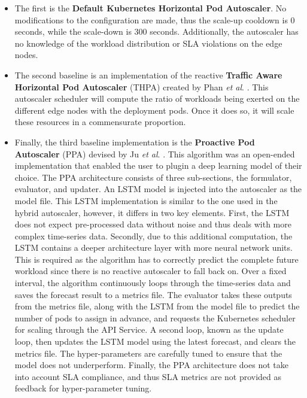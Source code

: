 \begin{itemize}
    \item The first is the \textbf{Default Kubernetes Horizontal Pod Autoscaler}. No modifications to the configuration are made, thus the scale-up cooldown is 0 seconds, while the scale-down is 300 seconds. Additionally, the autoscaler has no knowledge of the workload distribution or SLA violations on the edge nodes.
    \item The second baseline is an implementation of the reactive \textbf{Traffic Aware Horizontal Pod Autoscaler} (THPA) created by Phan \textit{et al}. \cite{phan2022traffic}. This autoscaler scheduler will compute the ratio of workloads being exerted on the different edge nodes with the deployment pods. Once it does so, it will scale these resources in a commensurate proportion.
    \item Finally, the third baseline implementation is the \textbf{Proactive Pod Autoscaler} (PPA) devised by Ju \textit{et al}. \cite{ju2021proactive}. This algorithm was an open-ended implementation that enabled the user to plugin a deep learning model of their choice. The PPA architecture consists of three sub-sections, the formulator, evaluator, and updater. An LSTM model is injected into the autoscaler as the model file. This LSTM implementation is similar to the one used in the hybrid autoscaler, however, it differs in two key elements. First, the LSTM does not expect pre-processed data without noise and thus deals with more complex time-series data. Secondly, due to this additional computation, the LSTM contains a deeper architecture layer with more neural network units. This is required as the algorithm has to correctly predict the complete future workload since there is no reactive autoscaler to fall back on. Over a fixed interval, the algorithm continuously loops through the time-series data and saves the forecast result to a metrics file. The evaluator takes these outputs from the metrics file, along with the LSTM from the model file to predict the number of pods to assign in advance, and requests the Kubernetes scheduler for scaling through the API Service. A second loop, known as the update loop, then updates the LSTM model using the latest forecast, and clears the metrics file. The hyper-parameters are carefully tuned to ensure that the model does not underperform. Finally, the PPA architecture does not take into account SLA compliance, and thus SLA metrics are not provided as feedback for hyper-parameter tuning.
\end{itemize}

